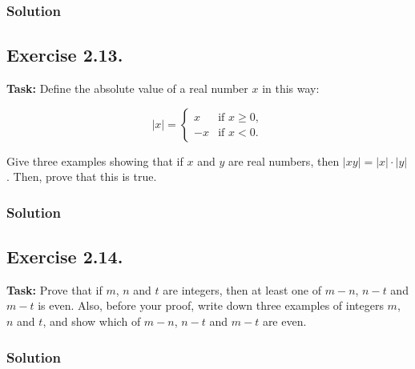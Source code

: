 \documentclass{article}
\begin{document}
\subsubsection*{Solution}



\subsection{Exercise 2.13.}
\textbf{Task:} Define the absolute value of a real number $x$ in this way:

\[
|x| = \begin{cases} 
x & \text{if } x \geq 0, \\
-x & \text{if } x < 0.
\end{cases}
\]

\noindent Give three examples showing that if $x$ and $y$ are real numbers, then $|xy|=|x|\cdot|y|$. Then, prove that this is true.

\subsubsection*{Solution}



\subsection{Exercise 2.14.}
\textbf{Task:} Prove that if $m$, $n$ and $t$ are integers, then at least one of $m-n$, $n-t$ and $m-t$ is even. Also, before your proof, write down three examples of integers $m$, $n$ and $t$, and show which of $m-n$, $n-t$ and $m-t$ are even.

\subsubsection*{Solution}
\end{document}

